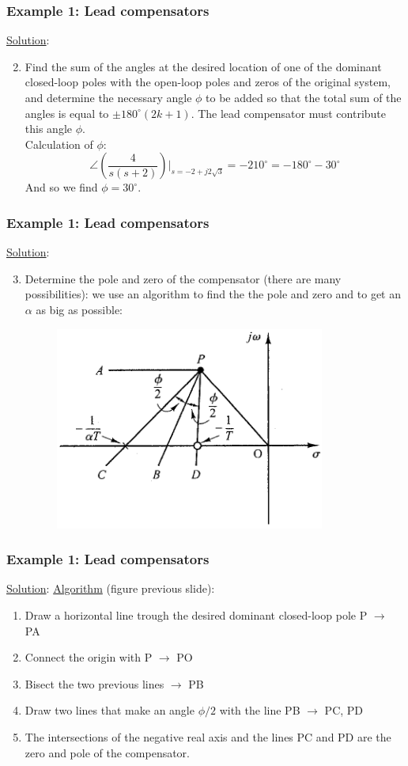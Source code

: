 \begin{frame}
	\frametitle{Example 1: Lead compensators}
	\underline{Solution}:
	\begin{enumerate}
		\setcounter{enumi}{1}
		\item  Find the sum of the angles at the desired location of one of the dominant closed-loop poles with the open-loop poles and zeros of the original system, and determine the necessary angle $\phi$ to be added so that the total sum of the angles is equal to $\pm 180^{\circ}(2k + 1)$. The lead compensator must contribute this angle $\phi$.\\
		Calculation of $\phi$: $$\angle(\frac{4}{s(s+2)})|_{s=-2+j2\sqrt{3}}=-210^{\circ}=-180^{\circ}-30^{\circ}$$
		And so we find $\phi=30^{\circ}$.
	\end{enumerate}
\end{frame}

\begin{frame}
	\frametitle{Example 1: Lead compensators}
	\underline{Solution}:
	\begin{enumerate}
		\setcounter{enumi}{2}
		\item Determine the pole and zero of the compensator (there are many possibilities): we use an algorithm to find the the pole and zero and to get an $\alpha$ as big as possible:
		\begin{figure}
			\centering
			\includegraphics[width=0.6\linewidth]{Ex1_draw_algoritme}
		\end{figure}
	\end{enumerate}
\end{frame}

\begin{frame}
	\frametitle{Example 1: Lead compensators}
	\underline{Solution}:
	\underline{Algorithm} (figure previous slide):
	\begin{enumerate}
		\item Draw a horizontal line trough the desired dominant closed-loop pole P $\rightarrow$ PA
		\item Connect the origin with P $\rightarrow$ PO
		\item Bisect the two previous lines $\rightarrow$ PB
		\item Draw two lines that make an angle $\phi/2$ with the line PB $\rightarrow$ PC, PD
		\item The intersections of the negative real axis and the lines PC and PD are the zero and pole of the compensator. 
	\end{enumerate}
\end{frame}

